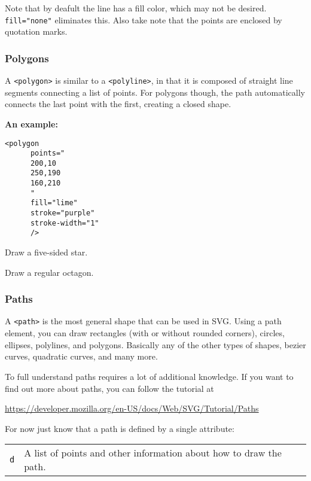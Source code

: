 \documentclass[11pt,a4paper]{report}
\begin{document}
Note that by deafult the line has a fill color, which may not be desired. \verb|fill="none"| eliminates this. Also take note that the points are enclosed by quotation marks.

\newpage
\subsubsection{Polygons}
A \verb|<polygon>| is similar to a \verb|<polyline>|, in that it is composed of straight line segments connecting a list of points. For polygons though, the path automatically connects the last point with the first, creating a closed shape.

{\bf An example:}
\begin{multicols}{2}
\begin{lstlisting}
<polygon 
      points="
      200,10 
      250,190 
      160,210
      " 
      fill="lime"
      stroke="purple"
      stroke-width="1" 
      />
\end{lstlisting}
\columnbreak

\end{multicols}

\begin{ex}
Draw a five-sided star.
\end{ex}

\begin{ex}
Draw a regular octagon.
\end{ex}

\newpage



\subsubsection{Paths}
A \verb|<path>| is the most general shape that can be used in SVG. Using a path element, you can draw rectangles (with or without rounded corners), circles, ellipses, polylines, and polygons. Basically any of the other types of shapes, bezier curves, quadratic curves, and many more.

To full understand paths requires a lot of additional knowledge. If you want to find out more about paths, you can follow the tutorial at

\url{https://developer.mozilla.org/en-US/docs/Web/SVG/Tutorial/Paths}

For now just know that a path is defined by a single attribute:
\begin{center}
\begin{tabular}{l|p{15cm}}
\verb|d| & A list of points and other information about how to draw the path.
\end{tabular}
\end{center}
\end{document}
